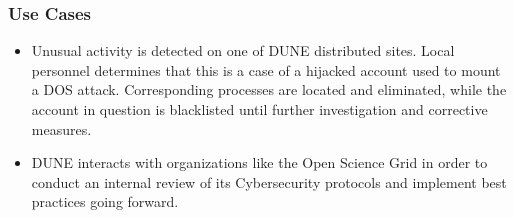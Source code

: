 \subsubsection{Use Cases}
\begin{itemize}
	\item Unusual activity is detected on one of DUNE distributed sites. Local personnel determines that this is a case of a hijacked account used to mount a DOS attack. Corresponding processes are located and eliminated, while the account in question is blacklisted until further investigation and corrective measures.
	
	\item DUNE interacts with organizations like the Open Science Grid in order to conduct an internal review of its Cybersecurity protocols and implement best practices going forward.
\end{itemize}

